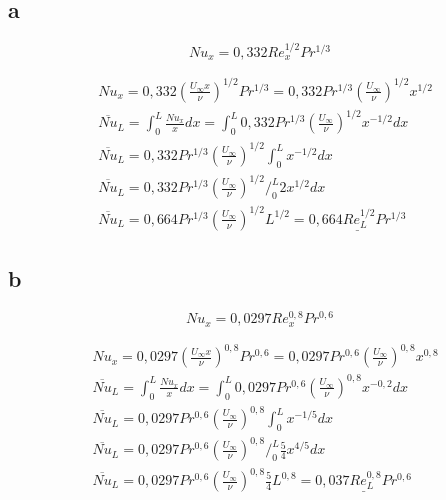 \documentclass[12pt,a4paper,finnish]{article}
\begin{document}
\subsection{a}

\begin{framed}
 \begin{equation}
  Nu_x = 0,332Re_x^{1/2}Pr^{1/3} 
 \end{equation}
\end{framed}

\begin{align}
 &Nu_x = 0,332\left(\frac{U_{\infty}x}{\nu}\right)^{1/2}Pr^{1/3}
   = 0,332Pr^{1/3}\left(\frac{U_{\infty}}{\nu}\right)^{1/2}x^{1/2}\\
 &\overline{Nu}_L = \int_0^L \frac{Nu_x}{x} dx = \int_0^L 0,332Pr^{1/3}\left(\frac{U_{\infty}}{\nu}\right)^{1/2}x^{-1/2} dx\\
 &\overline{Nu}_L = 0,332Pr^{1/3}\left(\frac{U_{\infty}}{\nu}\right)^{1/2}\int_0^L x^{-1/2} dx\\
 &\overline{Nu}_L = 0,332Pr^{1/3}\left(\frac{U_{\infty}}{\nu}\right)^{1/2}\bigg/_0^L 2x^{1/2} dx\\
 &\overline{Nu}_L = 0,664Pr^{1/3}\left(\frac{U_{\infty}}{\nu}\right)^{1/2}L^{1/2} = \underline{0,664Re_L^{1/2}Pr^{1/3}}
\end{align}

\subsection{b}

\begin{framed}
 \begin{equation}
  Nu_x = 0,0297Re_x^{0,8}Pr^{0,6}
 \end{equation}
\end{framed}

\begin{align}
 &Nu_x = 0,0297\left(\frac{U_{\infty}x}{\nu}\right)^{0,8}Pr^{0,6}
  = 0,0297Pr^{0,6}\left(\frac{U_{\infty}}{\nu}\right)^{0,8}x^{0,8}\\
 &\overline{Nu}_L = \int_0^L \frac{Nu_x}{x} dx = \int_0^L 0,0297Pr^{0,6}\left(\frac{U_{\infty}}{\nu}\right)^{0,8}x^{-0,2} dx\\
 &\overline{Nu}_L = 0,0297Pr^{0,6}\left(\frac{U_{\infty}}{\nu}\right)^{0,8}\int_0^L x^{-1/5} dx\\
 &\overline{Nu}_L = 0,0297Pr^{0,6}\left(\frac{U_{\infty}}{\nu}\right)^{0,8}\bigg/_0^L \frac{5}{4}x^{4/5} dx\\
 &\overline{Nu}_L = 0,0297Pr^{0,6}\left(\frac{U_{\infty}}{\nu}\right)^{0,8}\frac{5}{4}L^{0,8} = \underline{0,037Re_L^{0,8}Pr^{0,6}}
\end{align}
\end{document}
